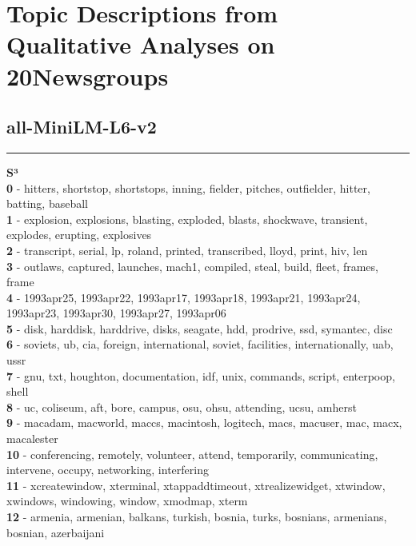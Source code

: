 \section{Topic Descriptions from Qualitative Analyses on 20Newsgroups}
\label{sec:topic_desc}
\subsection{all-MiniLM-L6-v2}\vspace{2mm}
\hrule\vspace{2mm}
\noindent
\textbf{S³}\vspace{2mm}\\
\vspace{2mm}
\noindent
\textbf{0} - hitters, shortstop, shortstops, inning, fielder, pitches, outfielder, hitter, batting, baseball\\
\textbf{1} - explosion, explosions, blasting, exploded, blasts, shockwave, transient, explodes, erupting, explosives\\
\textbf{2} - transcript, serial, lp, roland, printed, transcribed, lloyd, print, hiv, len\\
\textbf{3} - outlaws, captured, launches, mach1, compiled, steal, build, fleet, frames, frame\\
\textbf{4} - 1993apr25, 1993apr22, 1993apr17, 1993apr18, 1993apr21, 1993apr24, 1993apr23, 1993apr30, 1993apr27, 1993apr06\\
\textbf{5} - disk, harddisk, harddrive, disks, seagate, hdd, prodrive, ssd, symantec, disc\\
\textbf{6} - soviets, ub, cia, foreign, international, soviet, facilities, internationally, uab, ussr\\
\textbf{7} - gnu, txt, houghton, documentation, idf, unix, commands, script, enterpoop, shell\\
\textbf{8} - uc, coliseum, aft, bore, campus, osu, ohsu, attending, ucsu, amherst\\
\textbf{9} - macadam, macworld, maccs, macintosh, logitech, macs, macuser, mac, macx, macalester\\
\textbf{10} - conferencing, remotely, volunteer, attend, temporarily, communicating, intervene, occupy, networking, interfering\\
\textbf{11} - xcreatewindow, xterminal, xtappaddtimeout, xtrealizewidget, xtwindow, xwindows, windowing, window, xmodmap, xterm\\
\textbf{12} - armenia, armenian, balkans, turkish, bosnia, turks, bosnians, armenians, bosnian, azerbaijani\\
